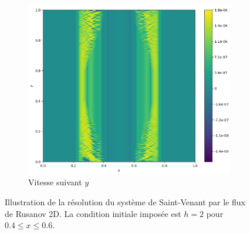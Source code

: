 \documentclass[
	french,
	11pt, %
]{fphw}
\begin{document}
\begin{figure}[H]
\begin{subfigure}{0.32\textwidth}
		\label{fig:Rusa1u}
	\end{subfigure}
	\begin{subfigure}{0.32\textwidth}
		\centering
		\includegraphics[width=\textwidth,height=0.85\textwidth]{Rusa1v.png}
		\caption{Vitesse suivant $y$}
		\label{fig:Rusa1v}
	\end{subfigure}
	\caption{Illustration de la résolution du système de Saint-Venant par le flux de Rusanov 2D. La condition initiale imposée est  $ h = 2$ pour $ 0.4 \leq x \leq 0.6$.}
	\label{fig:Rusa1}
\end{figure}
\end{document}
